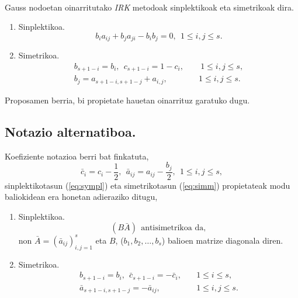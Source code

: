 \paragraph*{}Gauss nodoetan oinarritutako \emph{IRK} metodoak sinplektikoak eta simetrikoak dira. 
\begin{enumerate}
\item Sinplektikoa.
\begin{equation} 
\label{eq:sympl}
b_{i}a_{ij}+b_{j}a_{ji}-b_{i}b_{j}=0, \ \ 1 \leqslant i,j \leqslant s.
\end{equation} 
\item Simetrikoa.
\begin{align}
\label{eq:simm}
b_{s+1-i}=b_i, \ \ {c}_{s+1-i}=1-{c}_i,& \quad \ 1\leqslant i,j \leqslant s, \\
b_j={a}_{s+1-i,s+1-j}+a_{i,j},& \quad 1\leqslant i,j \leqslant s. 
\end{align} 
\end{enumerate}

Proposamen berria, bi propietate hauetan oinarrituz garatuko dugu.

\subsection*{Notazio alternatiboa.}

Koefiziente notazioa berri bat finkatuta,
\begin{equation*}
\bar{c}_i=c_i-\frac{1}{2}, \ \ \bar{a}_{ij}=a_{ij}-\frac{b_j}{2}, \ \ 1\leqslant i,j \leqslant s,
\end{equation*}
sinplektikotasun (\ref{eq:sympl}) eta simetrikotasun (\ref{eq:simm}) propietateak modu baliokidean era honetan adieraziko ditugu,
\begin{enumerate}
\item {Sinplektikoa.}
\begin{equation}
\label{eq:eqlineala}
(B \bar{A}) \ \ \mbox{antisimetrikoa da},
\end{equation}
non $\bar{A}=(\bar{a}_{ij})_{i,j=1}^s$ eta $B$, ($b_1,b_2,\dots,b_s$) balioen  matrize diagonala diren.

\item {Simetrikoa.}
\begin{align}
\label{eq:simm2}
b_{s+1-i}=b_i, \ \ \bar{c}_{s+1-i}=-\bar{c}_i,& \quad 1\leq i \leq s, \\
\bar{a}_{s+1-i,s+1-j}=-\bar{a}_{ij},& \quad 1\leq i,j \leq s. \\
\end{align} 

\end{enumerate}

